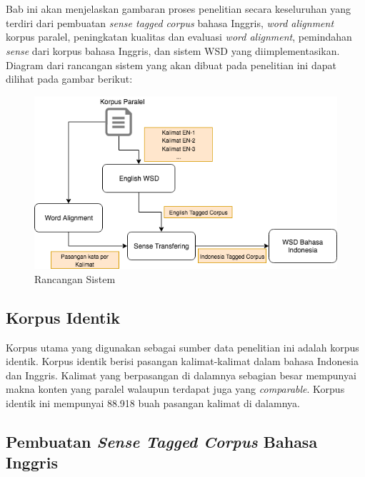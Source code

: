 \chapter{\babTiga}
Bab ini akan menjelaskan gambaran proses penelitian secara keseluruhan yang terdiri dari pembuatan \textit{sense tagged corpus} bahasa Inggris,  \textit{word alignment} korpus paralel, peningkatan kualitas dan evaluasi \textit{word alignment}, pemindahan \textit{sense} dari korpus bahasa Inggris, dan sistem WSD yang diimplementasikan. Diagram dari rancangan sistem yang akan dibuat pada penelitian ini dapat dilihat pada gambar berikut:

\begin{figure}
	\centering
	\includegraphics[width=1\linewidth]{adit_pics/WSD-full}
	\caption{Rancangan Sistem}
	\label{fig:Rancangan-Sistem}
\end{figure}


\section{Korpus Identik}
Korpus utama yang digunakan sebagai sumber data penelitian ini adalah korpus identik. Korpus identik berisi pasangan kalimat-kalimat dalam bahasa Indonesia dan Inggris. Kalimat yang berpasangan di dalamnya sebagian besar mempunyai makna konten yang paralel walaupun terdapat juga yang \textit{comparable}. Korpus identik ini mempunyai 88.918 buah pasangan kalimat di dalamnya.


\section{Pembuatan \textit{Sense Tagged Corpus} Bahasa Inggris}

